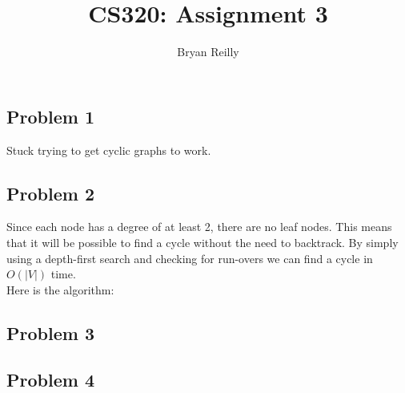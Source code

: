\documentclass{article}
\author{Bryan Reilly}
\title{CS320: Assignment 3}
\begin{document}
\maketitle{}
\subsection*{Problem 1}
Stuck trying to get cyclic graphs to work.
\subsection*{Problem 2}
Since each node has a degree of at least 2, there are no leaf nodes.
This means that it will be possible to find a cycle without the need to backtrack.
By simply using a depth-first search and checking for run-overs we can find a cycle in $O(|V|)$ time.
\\

Here is the algorithm:
\subsection*{Problem 3}

\subsection*{Problem 4}
\end{document}
